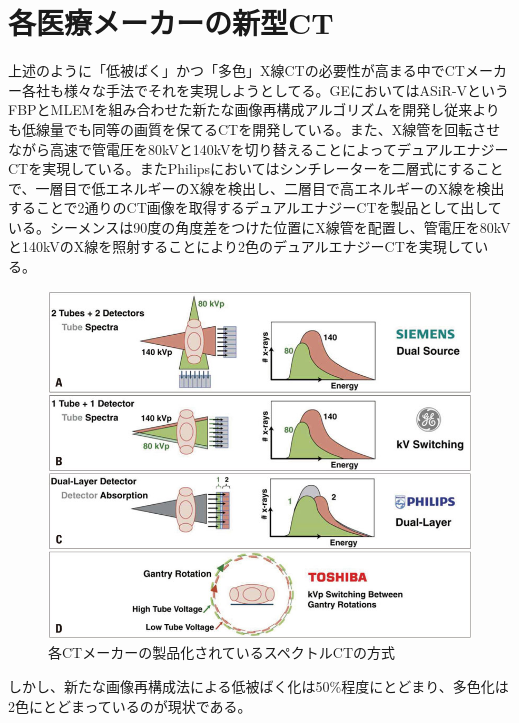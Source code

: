 \section{各医療メーカーの新型CT}
上述のように「低被ばく」かつ「多色」X線CTの必要性が高まる中でCTメーカー各社も様々な手法でそれを実現しようとしてる。GEにおいてはASiR-VというFBPとMLEMを組み合わせた新たな画像再構成アルゴリズムを開発し従来よりも低線量でも同等の画質を保てるCTを開発している。また、X線管を回転させながら高速で管電圧を80kVと140kVを切り替えることによってデュアルエナジーCTを実現している。またPhilipsにおいてはシンチレーターを二層式にすることで、一層目で低エネルギーのX線を検出し、二層目で高エネルギーのX線を検出することで2通りのCT画像を取得するデュアルエナジーCTを製品として出している。シーメンスは90度の角度差をつけた位置にX線管を配置し、管電圧を80kVと140kVのX線を照射することにより2色のデュアルエナジーCTを実現している。

\begin{figure}[H]
 \begin{center}
 \includegraphics[bb=0.000000 0.000000 399.724138 328.220690,width=0.7\hsize]{image2/chapter1/CT_maker.jpg} 
 \end{center}
 \caption{各CTメーカーの製品化されているスペクトルCTの方式\cite{dualCT}}
 \label{fig:maker}
\end{figure}

しかし、新たな画像再構成法による低被ばく化は50\%程度にとどまり、多色化は2色にとどまっているのが現状である。

